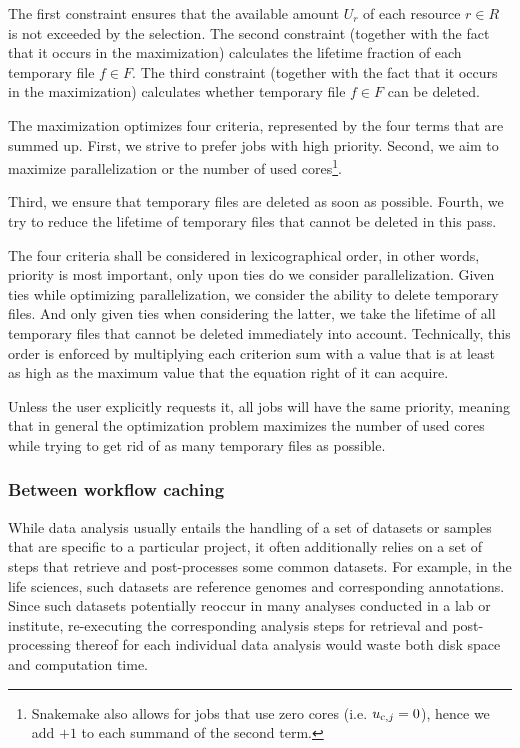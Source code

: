 \documentclass[parskip=half]{scrartcl}
\begin{document}
The first constraint ensures that the available amount $U_r$ of each resource $r \in R$ is not exceeded by the selection.
The second constraint (together with the fact that it occurs in the maximization) calculates the lifetime fraction of each temporary file $f \in F$.
The third constraint (together with the fact that it occurs in the maximization) calculates whether temporary file $f \in F$ can be deleted.

The maximization optimizes four criteria, represented by the four terms that are summed up.
First, we strive to prefer jobs with high priority.
Second, we aim to maximize parallelization or the number of used cores\footnote{Snakemake also allows for jobs that use zero cores (i.e. $u_{\text{c},j} = 0$), hence we add $+1$ to each summand of the second term.}.

Third, we ensure that temporary files are deleted as soon as possible.
Fourth, we try to reduce the lifetime of temporary files that cannot be deleted in this pass.

The four criteria shall be considered in lexicographical order, in other words, priority is most important, only upon ties do we consider parallelization.
Given ties while optimizing parallelization, we consider the ability to delete temporary files.
And only given ties when considering the latter, we take the lifetime of all temporary files that cannot be deleted immediately into account.
Technically, this order is enforced by multiplying each criterion sum with a value that is at least as high as the maximum value that the equation right of it can acquire.

Unless the user explicitly requests it, all jobs will have the same priority, meaning that in general the optimization problem maximizes the number of used cores while trying to get rid of as many temporary files as possible.

\subsubsection{Between workflow caching}

While data analysis usually entails the handling of a set of datasets or samples that are specific to a particular project, it often additionally relies on a set of steps that retrieve and post-processes some common datasets.
For example, in the life sciences, such datasets are reference genomes and corresponding annotations.
Since such datasets potentially reoccur in many analyses conducted in a lab or institute, re-executing the corresponding analysis steps for retrieval and post-processing thereof for each individual data analysis would waste both disk space and computation time.
\end{document}
